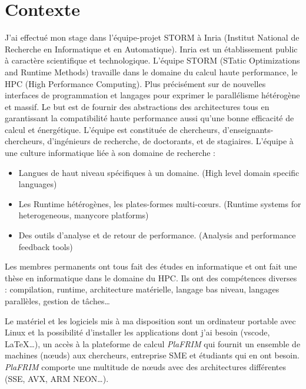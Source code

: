 \section{Contexte}
J'ai effectué mon stage dans l'équipe-projet STORM à Inria (Institut National de
Recherche en Informatique et en Automatique). Inria est un établissement public à
caractère scientifique et technologique.
L'équipe STORM (STatic Optimizations and Runtime Methods) travaille dans le domaine du
calcul haute performance, le HPC (High Performance Computing). Plus précisément sur
de  nouvelles interfaces de programmation et langages pour exprimer le parallélisme
hétérogène et massif. Le but est de fournir des abstractions des architectures tous en
garantissant la compatibilité haute performance aussi qu'une bonne efficacité de calcul
et énergétique.
L'équipe est constituée de chercheurs, d'enseignants-chercheurs, d'ingénieurs de recherche,
de doctorants, et de stagiaires.
L'équipe à une culture informatique liée à son domaine de recherche :

\begin{itemize}
  \item Langues de haut niveau spécifiques à un domaine. (High level domain specific languages)
  \item Les Runtime hétérogènes, les plates-formes multi-cœurs. (Runtime systems for heterogeneous, manycore platforms)
  \item Des outils d'analyse et de retour de performance. (Analysis and performance feedback tools)
\end{itemize}

Les membres permanents ont tous fait des études en informatique et ont fait une thèse en
informatique dans le domaine du HPC. Ils ont des compétences diverses : compilation, runtime,
architecture matérielle, langage bas niveau, langages parallèles, gestion de tâches\dots

Le matériel et les logiciels mis à ma disposition sont un ordinateur portable avec Linux
et la possibilité d'installer les applications dont j'ai besoin (vscode, \LaTeX\dots), un
accès à la plateforme de calcul \emph{PlaFRIM} qui fournit un ensemble de machines (nœuds)
aux chercheurs, entreprise SME et étudiants qui en ont besoin. \emph{PlaFRIM} comporte une
multitude de nœuds avec des architectures différentes (SSE, AVX, ARM NEON\dots).
